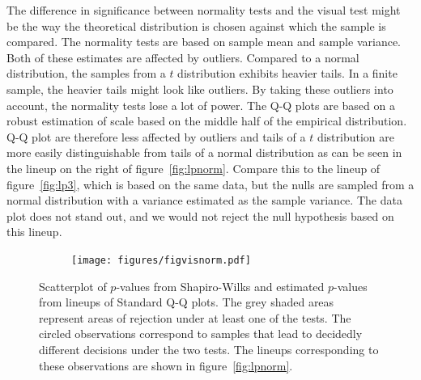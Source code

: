\documentclass{article}\usepackage[]{graphicx}\usepackage[]{color}
\newcommand{\hh}[1]{{\color{magenta} #1}}
\begin{document}
\hh{The difference in significance between normality tests and the visual test might be the way the theoretical distribution is chosen against which the sample is compared. The normality tests are based on sample mean and sample variance. Both of these estimates are affected by outliers. Compared to a normal distribution, the samples from a $t$ distribution exhibits heavier tails. In a finite sample, the heavier tails might look like outliers. By taking these outliers into account, the normality tests lose a lot of power. The Q-Q plots are based on a robust estimation of scale based on the middle half of the empirical distribution. Q-Q plot are therefore less affected by outliers and tails of a $t$ distribution are more easily distinguishable from tails of a normal distribution as can be seen in the lineup on the right of figure~\ref{fig:lpnorm}. Compare this to the lineup of figure~\ref{fig:lp3}, which is based on the same data, but the nulls are sampled from a normal distribution with a variance estimated as the sample variance. The data plot does not stand out, and we would not reject the null hypothesis based on this lineup. }

\begin{figure}
\centering
\begin{subfigure}[t]{.4\textwidth}
\texttt{[image: figures/figvisnorm.pdf]} 
\vfill
\end{subfigure}
\caption{\label{fig:visnorm}  Scatterplot of $p$-values from Shapiro-Wilks and estimated $p$-values from lineups of Standard Q-Q plots. The grey shaded areas represent areas of rejection under at least one of the tests. The circled observations correspond to samples that lead to decidedly different decisions under the two tests. The lineups corresponding to these observations are shown in figure~\ref{fig:lpnorm}.}
\end{figure}
\end{document}

